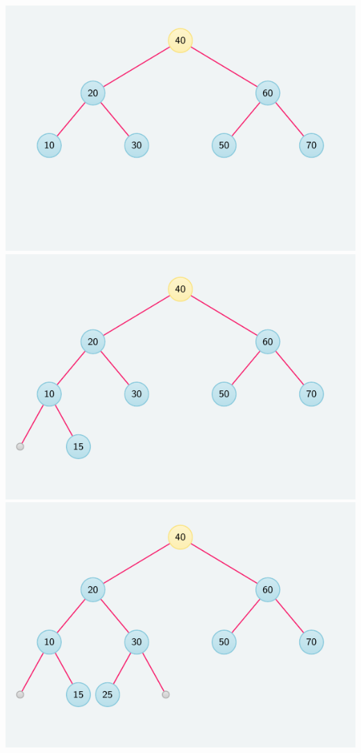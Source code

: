 \documentclass[crop,10pt]{standalone}
\begin{document}
    \includegraphics{frames/tree-06.pdf}
    \includegraphics{frames/tree-07.pdf}
    \includegraphics{frames/tree-08.pdf}
\end{document}

